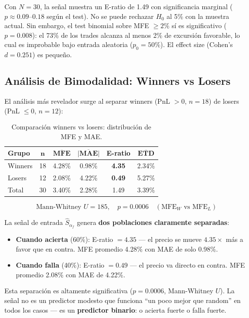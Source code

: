 \documentclass[11pt,a4paper]{article}
\newcommand{\score}{\hat{S}_{\alpha_f}}
\begin{document}
\begin{tcolorbox}[warnbox, title=Significancia Marginal]
Con $N=30$, la se\~nal muestra un E-ratio de 1.49 con significancia
marginal ($p \approx 0.09$--$0.18$ seg\'un el test). No se puede
rechazar $H_0$ al 5\% con la muestra actual. Sin embargo, el test
binomial sobre MFE $\geq 2\%$ s\'i es significativo ($p = 0.008$):
el 73\% de los trades alcanza al menos 2\% de excursi\'on favorable,
lo cual es improbable bajo entrada aleatoria ($p_0 = 50\%$).
El effect size (Cohen's $d = 0.251$) es peque\~no.
\end{tcolorbox}


\subsection{An\'alisis de Bimodalidad: Winners vs Losers}
\label{sec:bimodality}

El an\'alisis m\'as revelador surge al separar winners (PnL $> 0$, $n=18$)
de losers (PnL $\leq 0$, $n=12$):

\begin{table}[H]
\centering
\caption{Comparaci\'on winners vs losers: distribuci\'on de MFE y MAE.}
\label{tab:bimodal}
\begin{tabular}{lccccc}
\toprule
\textbf{Grupo} & $\bm{n}$ & $\overline{\textbf{MFE}}$ & $\overline{|\textbf{MAE}|}$ & \textbf{E-ratio} & $\overline{\textbf{ETD}}$ \\
\midrule
Winners & 18 & 4.28\% & 0.98\% & \textbf{4.35} & 2.34\% \\
Losers & 12 & 2.08\% & 4.22\% & \textbf{0.49} & 5.27\% \\
\midrule
Total & 30 & 3.40\% & 2.28\% & 1.49 & 3.39\% \\
\bottomrule
\end{tabular}
\end{table}

\begin{equation}
\text{Mann-Whitney } U = 185, \quad p = 0.0006 \quad (\text{MFE}_{W} \text{ vs } \text{MFE}_{L})
\end{equation}

\begin{tcolorbox}[versionbox=cgreen, title=Resultado Clave: Bimodalidad Significativa ($p < 0.001$)]
La se\~nal de entrada $\score$ genera \textbf{dos poblaciones claramente
separadas}:
\begin{itemize}[leftmargin=1.5em]
\item \textbf{Cuando acierta} (60\%): E-ratio $= 4.35$ --- el precio se mueve
  $4.35\times$ m\'as a favor que en contra. MFE promedio 4.28\% con MAE
  de solo 0.98\%.
\item \textbf{Cuando falla} (40\%): E-ratio $= 0.49$ --- el precio va
  directo en contra. MFE promedio 2.08\% con MAE de 4.22\%.
\end{itemize}
Esta separaci\'on es altamente significativa ($p = 0.0006$, Mann-Whitney $U$).
La se\~nal no es un predictor modesto que funciona ``un poco mejor que random''
en todos los casos --- es un \textbf{predictor binario}: o acierta fuerte
o falla fuerte.
\end{tcolorbox}
\end{document}

